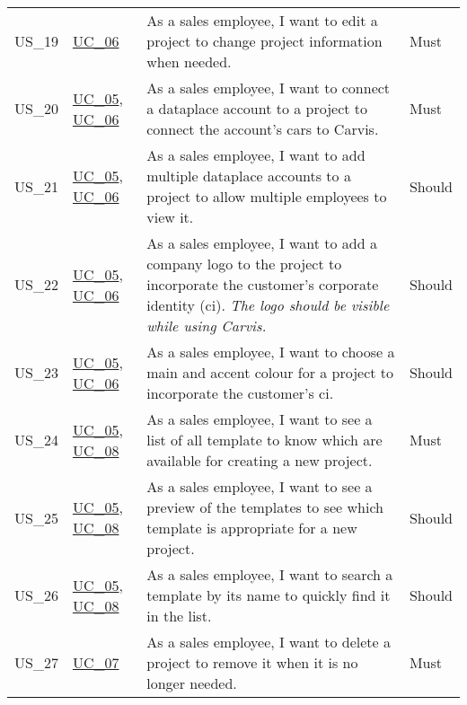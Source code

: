 \begin{footnotesize}
\begin{longtable}[L L L L]{ p{} p{} p{} p{} }
      \hypertarget{Ref:US19}{US\_19} & \hyperlink{Ref:UC6}{UC\_06} & As a sales employee, I want to edit a project to change project information when needed. & Must \\
      \hypertarget{Ref:US20}{US\_20} & \hyperlink{Ref:UC5}{UC\_05}, \newline \hyperlink{Ref:UC6}{UC\_06} & As a sales employee, I want to connect a \gls{dataplace} account to a project to connect the account's cars to Carvis. & Must \\
      \hypertarget{Ref:US21}{US\_21} & \hyperlink{Ref:UC5}{UC\_05}, \newline \hyperlink{Ref:UC6}{UC\_06} & As a sales employee, I want to add multiple \gls{dataplace} accounts to a project to allow multiple employees to view it. & Should \\
      \hypertarget{Ref:US22}{US\_22} & \hyperlink{Ref:UC5}{UC\_05}, \newline \hyperlink{Ref:UC6}{UC\_06} & As a sales employee, I want to add a company logo to the project to incorporate the customer's corporate identity (\gls{ci}). 
      \newline
      \emph{The logo should be visible while using Carvis.} & Should
      \\
      \hypertarget{Ref:US23}{US\_23} & \hyperlink{Ref:UC5}{UC\_05}, \newline \hyperlink{Ref:UC6}{UC\_06} & As a sales employee, I want to choose a main and accent colour for a project to incorporate the customer's \gls{ci}. & Should \\
      \hypertarget{Ref:US24}{US\_24} & \hyperlink{Ref:UC5}{UC\_05}, \newline \hyperlink{Ref:UC8}{UC\_08} & As a sales employee, I want to see a list of all template to know which are available for creating a new project. & Must \\
      \hypertarget{Ref:US25}{US\_25} & \hyperlink{Ref:UC5}{UC\_05}, \newline \hyperlink{Ref:UC8}{UC\_08} & As a sales employee, I want to see a preview of the templates to see which template is appropriate for a new project. & Should \\
      \hypertarget{Ref:US26}{US\_26} & \hyperlink{Ref:UC5}{UC\_05}, \newline \hyperlink{Ref:UC8}{UC\_08} & As a sales employee, I want to search a template by its name to quickly find it in the list. & Should \\
      \hypertarget{Ref:US27}{US\_27} & \hyperlink{Ref:UC7}{UC\_07} & As a sales employee, I want to delete a project to remove it when it is no longer needed. & Must \\

\end{longtable}
\end{footnotesize}
